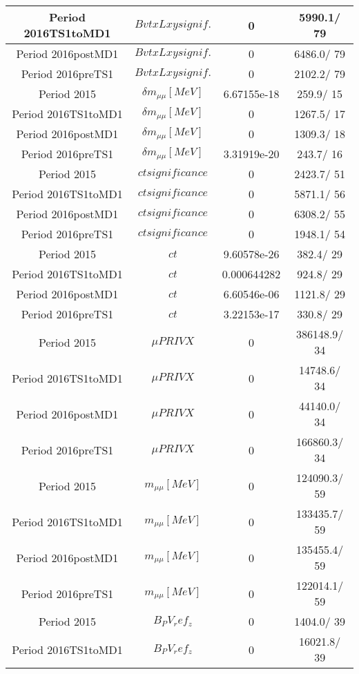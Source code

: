 \documentclass{article}
\begin{document}
\begin{longtable}{c|c|c|c}
\hline
 Period 2016TS1toMD1 & $BvtxLxy signif.$ & 0 & 5990.1/ 79\\
\hline
 Period 2016postMD1 & $BvtxLxy signif.$ & 0 & 6486.0/ 79\\
\hline
 Period 2016preTS1 & $BvtxLxy signif.$ & 0 & 2102.2/ 79\\
\hline
 Period 2015 & $\delta m_{\mu\mu} [MeV]$ & 6.67155e-18 & 259.9/ 15\\
\hline
 Period 2016TS1toMD1 & $\delta m_{\mu\mu} [MeV]$ & 0 & 1267.5/ 17\\
\hline
 Period 2016postMD1 & $\delta m_{\mu\mu} [MeV]$ & 0 & 1309.3/ 18\\
\hline
 Period 2016preTS1 & $\delta m_{\mu\mu} [MeV]$ & 3.31919e-20 & 243.7/ 16\\
\hline
 Period 2015 & $ct significance$ & 0 & 2423.7/ 51\\
\hline
 Period 2016TS1toMD1 & $ct significance$ & 0 & 5871.1/ 56\\
\hline
 Period 2016postMD1 & $ct significance$ & 0 & 6308.2/ 55\\
\hline
 Period 2016preTS1 & $ct significance$ & 0 & 1948.1/ 54\\
\hline
 Period 2015 & $ct$ & 9.60578e-26 & 382.4/ 29\\
\hline
 Period 2016TS1toMD1 & $ct$ & 0.000644282 & 924.8/ 29\\
\hline
 Period 2016postMD1 & $ct$ & 6.60546e-06 & 1121.8/ 29\\
\hline
 Period 2016preTS1 & $ct$ & 3.22153e-17 & 330.8/ 29\\
\hline
 Period 2015 & $\mu PRIVX$ & 0 & 386148.9/ 34\\
\hline
 Period 2016TS1toMD1 & $\mu PRIVX$ & 0 & 14748.6/ 34\\
\hline
 Period 2016postMD1 & $\mu PRIVX$ & 0 & 44140.0/ 34\\
\hline
 Period 2016preTS1 & $\mu PRIVX$ & 0 & 166860.3/ 34\\
\hline
 Period 2015 & $m_{\mu\mu} [MeV]$ & 0 & 124090.3/ 59\\
\hline
 Period 2016TS1toMD1 & $m_{\mu\mu} [MeV]$ & 0 & 133435.7/ 59\\
\hline
 Period 2016postMD1 & $m_{\mu\mu} [MeV]$ & 0 & 135455.4/ 59\\
\hline
 Period 2016preTS1 & $m_{\mu\mu} [MeV]$ & 0 & 122014.1/ 59\\
\hline
 Period 2015 & $B_PV_ref_z$ & 0 & 1404.0/ 39\\
\hline
 Period 2016TS1toMD1 & $B_PV_ref_z$ & 0 & 16021.8/ 39\\

\end{longtable}
\end{document}

